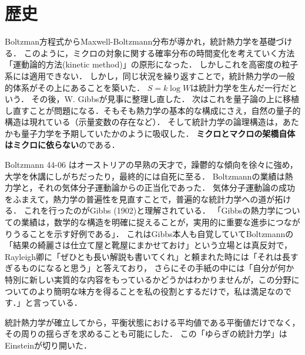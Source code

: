 \documentclass[uplatex,dvipdfmx]{jsreport}
\begin{document}
\section{歴史}

\begin{tcolorbox}[colframe=ForestGreen, colback=ForestGreen!10!white,breakable,colbacktitle=ForestGreen!40!white,coltitle=black,fonttitle=\bfseries\sffamily,
title=]
    
\end{tcolorbox}

\begin{history}
    Boltzman方程式からMaxwell-Boltzmann分布が導かれ，統計熱力学を基礎づける．
    このように，ミクロの対象に関する確率分布の時間変化を考えていく方法「運動論的方法(kinetic method)」の原形になった．
    しかしこれを高密度の粒子系には適用できない．
    しかし，同じ状況を繰り返すことで，統計熱力学の一般的体系がその上にあることを築いた．
    $S=k\log W$は統計力学を生んだ一行だという．
    その後，W. Gibbsが見事に整理し直した．
    次はこれを量子論の上に移植し直すことが問題になる．そもそも熱力学の基本的な構成にさえ，自然の量子的構造は現れている（示量変数の存在など）．
    そして統計力学の論理構造は，あたかも量子力学を予期していたかのように吸収した．
    \textbf{ミクロとマクロの架橋自体はミクロに依らない}のである．
\end{history}
\begin{remarks}[Gibbsという男]
    Boltzmann 44-06 はオーストリアの早熟の天才で，躁鬱的な傾向を徐々に強め，大学を休講にしがちだったり，最終的には自死に至る．
    Boltzmannの業績は熱力学と，それの気体分子運動論からの正当化であった．
    気体分子運動論の成功をふまえて，熱力学の普遍性を見直すことで，普遍的な統計力学への道が拓ける．
    これを行ったのがGibbs (1902)と理解されている．
    「Gibbsの熱力学についての業績は，数学的な構造を明確に捉えることが，実用的に重要な進歩につながりうることを示す好例である」\cite{田崎}．
    これはGibbs本人も自覚していてBoltzmannの「結果の綺麗さは仕立て屋と靴屋にまかせておけ」という立場とは真反対で，Rayleigh卿に「ぜひとも長い解説も書いてくれ」と頼まれた時には「それは長すぎるものになると思う」と答えており，
    さらにその手紙の中には「自分が何か特別に新しい実質的な内容をもっているかどうかはわかりませんが，この分野についてのより簡明な味方を得ることを私の役割とするだけで，私は満足なのです．」と言っている．
\end{remarks}

\begin{history}[ゆらぎの物理学]
    統計熱力学が確立してから，平衡状態における平均値である平衡値だけでなく，その周りの揺らぎを求めることも可能にした．
    この「ゆらぎの統計力学」はEinsteinが切り開いた．
\end{history}
\end{document}
